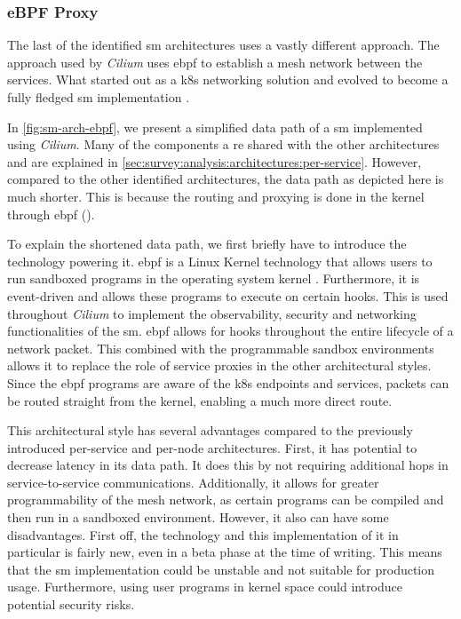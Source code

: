 \subsubsection{eBPF Proxy}
\label{sec:survey:analysis:architectures:ebpf}

The last of the identified \gls{sm} architectures uses a vastly different approach. The approach used by \textit{Cilium} uses \gls{ebpf} to establish a mesh network between the services. What started out as a \gls{k8s} networking solution and evolved to become a fully fledged \gls{sm} implementation \cite{cilium-mesh}. 

In \cref{fig:sm-arch-ebpf}, we present a simplified data path of a \gls{sm} implemented using \textit{Cilium}.  Many of the components a re shared with the other architectures and are explained in \cref{sec:survey:analysis:architectures:per-service}. However, compared to the other identified architectures, the data path as depicted here is much shorter. This is because the routing and proxying is done in the kernel through \gls{ebpf} (). 

To explain the shortened data path, we first briefly have to introduce the technology powering it. \gls{ebpf} is a Linux Kernel technology that allows users to run sandboxed programs in the operating system kernel \cite{ebpf}. Furthermore, it is event-driven and allows these programs to execute on certain hooks. This is used throughout \textit{Cilium} to implement the observability, security and networking functionalities of the \gls{sm}. \gls{ebpf} allows for hooks throughout the entire lifecycle of a network packet. This combined with the programmable sandbox environments allows it to replace the role of service proxies in the other architectural styles. Since the \gls{ebpf} programs are aware of the \gls{k8s} endpoints and services, packets can be routed straight from the kernel, enabling a much more direct route.

This architectural style has several advantages compared to the previously introduced per-service and per-node architectures. First, it has potential to decrease latency in its data path. It does this by not requiring additional hops in service-to-service communications. Additionally, it allows for greater programmability of the mesh network, as certain programs can be compiled and then run in a sandboxed environment. However, it also can have some disadvantages. First off, the technology and this implementation of it in particular is fairly new, even in a beta phase at the time of writing. This means that the \gls{sm} implementation could be unstable and not suitable for production usage. Furthermore, using user programs in kernel space could introduce potential security risks. 




